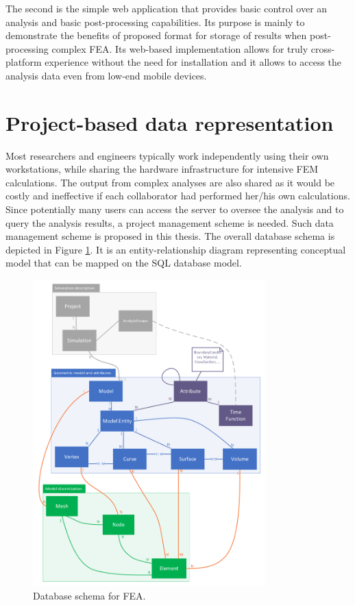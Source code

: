 The second is the simple web application that provides basic control over an analysis and basic post-processing capabilities. Its purpose is mainly to demonstrate the benefits of proposed format for storage of results when post-processing complex FEA. Its web-based implementation allows for truly cross-platform experience without the need for installation and it allows to access the analysis data even from low-end mobile devices.

\section{Project-based data representation}
\label{sec:project-db-schema}

Most researchers and engineers typically work independently using their own workstations, while sharing the hardware infrastructure for intensive FEM calculations. The output from complex analyses are also shared as it would be costly and ineffective if each collaborator had performed her/his own calculations. Since potentially many users can access the server to oversee the analysis and to query the analysis results, a project management scheme is needed. Such data management scheme is proposed in this thesis. The overall database schema is depicted in Figure \ref{fig:FEA-db-schema}. It is an entity-relationship diagram representing conceptual model that can be mapped on the SQL database model.

\begin{figure}[H]
    \centering
    \includegraphics[width=0.8\textwidth]{figures/chapter-data-management/FEA-database-schema}
    \decoRule
    \caption{Database schema for FEA.}
    \label{fig:FEA-db-schema}
\end{figure}


